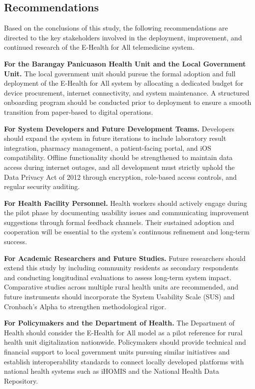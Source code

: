 \documentclass{research}
\begin{document}
\subsection*{Recommendations}

Based on the conclusions of this study, the following recommendations are directed to the key
stakeholders involved in the deployment, improvement, and continued research of the E-Health for
All telemedicine system.

\textbf{For the Barangay Panicuason Health Unit and the Local Government Unit.} The local
government unit should pursue the formal adoption and full deployment of the E-Health for All
system by allocating a dedicated budget for device procurement, internet connectivity, and system
maintenance. A structured onboarding program should be conducted prior to deployment to ensure a
smooth transition from paper-based to digital operations.

\textbf{For System Developers and Future Development Teams.} Developers should expand the system
in future iterations to include laboratory result integration, pharmacy management, a
patient-facing portal, and iOS compatibility. Offline functionality should be strengthened to
maintain data access during internet outages, and all development must strictly uphold the Data
Privacy Act of 2012 through encryption, role-based access controls, and regular security auditing.

\textbf{For Health Facility Personnel.} Health workers should actively engage during the pilot
phase by documenting usability issues and communicating improvement suggestions through formal
feedback channels. Their sustained adoption and cooperation will be essential to the system's
continuous refinement and long-term success.

\textbf{For Academic Researchers and Future Studies.} Future researchers should extend this study
by including community residents as secondary respondents and conducting longitudinal evaluations
to assess long-term system impact. Comparative studies across multiple rural health units are
recommended, and future instruments should incorporate the System Usability Scale (SUS) and
Cronbach's Alpha to strengthen methodological rigor.

\textbf{For Policymakers and the Department of Health.} The Department of Health should consider
the E-Health for All model as a pilot reference for rural health unit digitalization nationwide.
Policymakers should provide technical and financial support to local government units pursuing
similar initiatives and establish interoperability standards to connect locally developed platforms
with national health systems such as iHOMIS and the National Health Data Repository.



\end{document}

